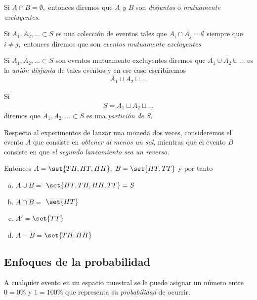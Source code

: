 {}
 Si $A\cap B= \emptyset,$ entonces diremos que \emph{$A$ y $B$} son \emph{disjuntos} o \emph{mutuamente excluyentes.} 

 \begin{defn}
  Si $A_{1},A_{2},... \subset S$ es una colección de eventos tales que $A_{i}\cap A_{j}=\emptyset$ siempre que $i\neq j,$ entonces diremos que son \emph{eventos mutuamente excluyentes}
 \end{defn}

 


 \begin{defn}
  Si $A_{1}, A_{2}, ...\subset S$ son eventos mutuamente excluyentes diremos que $A_{1} \cup A_{2} \cup ... $ es la \emph{unión disjunta} de tales eventos y en ese caso escribiremos
  \begin{align*}
A_{1}\sqcup A_{2} \sqcup ...
\end{align*}
 \end{defn}


\begin{defn}
	Si \begin{align*}
		S=A_{1}\sqcup A_{2} \sqcup ...
	\end{align*}
	diremos que $A_{1},A_{2},...\subset S$  es una \emph{partición de $S.$}
\end{defn}


 \begin{ejemplo}
  \label{exmp:0.1.9}
  Respecto al experimentos de lanzar una moneda dos veces, consideremos el evento $A$ que consiste en \emph{obtener al menos un sol,}  mientras que el evento $B$ consiste en que \emph{el segundo lanzamiento sea un reverso.}

  Entonces $A=\set{TH,HT,HH},$ $B=\set{HT,TT}$ y por tanto 
  \begin{enumerate}[(a)]
   \item $A\cup B =$ $\set{HT,TH,HH,TT}= S$ 
	\item $A\cap B =$ $\set{HT}$ 
	\item $A'=$$\set{TT}$
	\item $A-B=$$\set{TH,HH}$
  \end{enumerate}

 \end{ejemplo}


\subsection{Enfoques de la probabilidad}

A cualquier evento en un espacio muestral se le puede asignar un número entre $0=0\%$ y $1=100\%$ que representa su \emph{probabilidad} de ocurrir.


